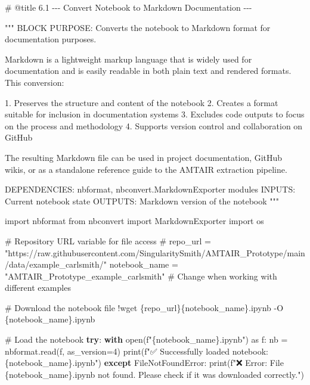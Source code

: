 \documentclass[
  11pt,
  letterpaper,
]{book}
\newenvironment{Shaded}{\begin{snugshade}}{\end{snugshade}}
\newcommand{\BuiltInTok}[1]{\textcolor[rgb]{0.00,0.23,0.31}{#1}}
\newcommand{\CommentTok}[1]{\textcolor[rgb]{0.37,0.37,0.37}{#1}}
\newcommand{\ControlFlowTok}[1]{\textcolor[rgb]{0.00,0.23,0.31}{\textbf{#1}}}
\newcommand{\DecValTok}[1]{\textcolor[rgb]{0.68,0.00,0.00}{#1}}
\newcommand{\ImportTok}[1]{\textcolor[rgb]{0.00,0.46,0.62}{#1}}
\newcommand{\NormalTok}[1]{\textcolor[rgb]{0.00,0.23,0.31}{#1}}
\newcommand{\OperatorTok}[1]{\textcolor[rgb]{0.37,0.37,0.37}{#1}}
\newcommand{\PreprocessorTok}[1]{\textcolor[rgb]{0.68,0.00,0.00}{#1}}
\newcommand{\SpecialCharTok}[1]{\textcolor[rgb]{0.37,0.37,0.37}{#1}}
\newcommand{\SpecialStringTok}[1]{\textcolor[rgb]{0.13,0.47,0.30}{#1}}
\newcommand{\StringTok}[1]{\textcolor[rgb]{0.13,0.47,0.30}{#1}}
\begin{document}
\begin{Shaded}
\begin{Highlighting}[]
\CommentTok{\# @title 6.1 {-}{-}{-} Convert Notebook to Markdown Documentation {-}{-}{-}}

\CommentTok{"""}
\CommentTok{BLOCK PURPOSE: Converts the notebook to Markdown format for documentation purposes.}

\CommentTok{Markdown is a lightweight markup language that is widely used for documentation}
\CommentTok{and is easily readable in both plain text and rendered formats. This conversion:}

\CommentTok{1. Preserves the structure and content of the notebook}
\CommentTok{2. Creates a format suitable for inclusion in documentation systems}
\CommentTok{3. Excludes code outputs to focus on the process and methodology}
\CommentTok{4. Supports version control and collaboration on GitHub}

\CommentTok{The resulting Markdown file can be used in project documentation, GitHub wikis,}
\CommentTok{or as a standalone reference guide to the AMTAIR extraction pipeline.}

\CommentTok{DEPENDENCIES: nbformat, nbconvert.MarkdownExporter modules}
\CommentTok{INPUTS: Current notebook state}
\CommentTok{OUTPUTS: Markdown version of the notebook}
\CommentTok{"""}

\ImportTok{import}\NormalTok{ nbformat}
\ImportTok{from}\NormalTok{ nbconvert }\ImportTok{import}\NormalTok{ MarkdownExporter}
\ImportTok{import}\NormalTok{ os}

\CommentTok{\# Repository URL variable for file access}
\CommentTok{\# repo\_url = "https://raw.githubusercontent.com/SingularitySmith/AMTAIR\_Prototype/main/data/example\_carlsmith/"}
\NormalTok{notebook\_name }\OperatorTok{=} \StringTok{"AMTAIR\_Prototype\_example\_carlsmith"}  \CommentTok{\# Change when working with different examples}

\CommentTok{\# Download the notebook file}
\OperatorTok{!}\NormalTok{wget \{repo\_url\}\{notebook\_name\}.ipynb }\OperatorTok{{-}}\NormalTok{O \{notebook\_name\}.ipynb}

\CommentTok{\# Load the notebook}
\ControlFlowTok{try}\NormalTok{:}
  \ControlFlowTok{with} \BuiltInTok{open}\NormalTok{(}\SpecialStringTok{f"}\SpecialCharTok{\{}\NormalTok{notebook\_name}\SpecialCharTok{\}}\SpecialStringTok{.ipynb"}\NormalTok{) }\ImportTok{as}\NormalTok{ f:}
\NormalTok{    nb }\OperatorTok{=}\NormalTok{ nbformat.read(f, as\_version}\OperatorTok{=}\DecValTok{4}\NormalTok{)}
  \BuiltInTok{print}\NormalTok{(}\SpecialStringTok{f"✅ Successfully loaded notebook: }\SpecialCharTok{\{}\NormalTok{notebook\_name}\SpecialCharTok{\}}\SpecialStringTok{.ipynb"}\NormalTok{)}
\ControlFlowTok{except} \PreprocessorTok{FileNotFoundError}\NormalTok{:}
  \BuiltInTok{print}\NormalTok{(}\SpecialStringTok{f"❌ Error: File \textquotesingle{}}\SpecialCharTok{\{}\NormalTok{notebook\_name}\SpecialCharTok{\}}\SpecialStringTok{.ipynb\textquotesingle{} not found. Please check if it was downloaded correctly."}\NormalTok{)}



\end{Highlighting}
\end{Shaded}
\end{document}
